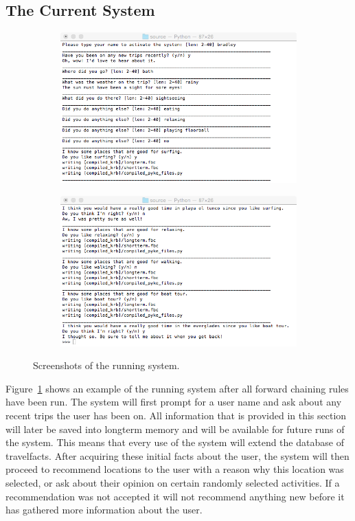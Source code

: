 \documentclass[11pt]{article} %
\begin{document}
\subsection{The Current System}
\begin{figure}[!htb]
	\begin{subfigure}[b]{0.48\textwidth}
		\centering
		\includegraphics[width=\textwidth]{system2.png}
		\caption{ }
	\end{subfigure}
	\hfill	
	\begin{subfigure}[b]{0.48\textwidth}
		\centering
		\includegraphics[width=\textwidth]{system1.png}
		\caption{ }
	\end{subfigure}
	\caption{Screenshots of the running system.}\label{fig:system}
\end{figure}
Figure~\ref{fig:system} shows an example of the running system after all forward chaining rules have been run. The system will first prompt for a user name and ask about any recent trips the user has been on. All information that is provided in this section will later be saved into longterm memory and will be available for future runs of the system. This means that every use of the system will extend the database of travelfacts.
After acquiring these initial facts about the user, the system will then proceed to recommend locations to the user with a reason why this location was selected, or ask about their opinion on certain randomly selected activities. If a recommendation was not accepted it will not recommend anything new before it has gathered more information about the user.
\end{document}
